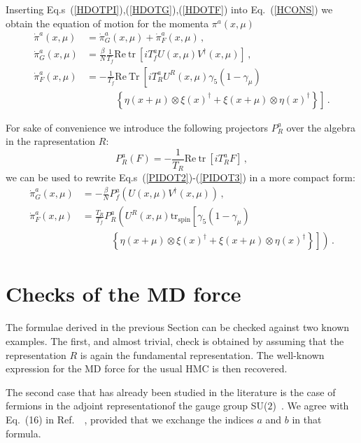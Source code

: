 \documentclass{article}[12pt]
\begin{document}
Inserting Eq.s~(\ref{HDOTPI}),(\ref{HDOTG}),(\ref{HDOTF}) into Eq.~(\ref{HCONS}) we obtain the equation of motion
for the momenta $\pi^a(x,\mu)$
\begin{align}
\dot\pi^a(x,\mu) &= \dot\pi^a_G(x,\mu) + \dot\pi^a_F(x,\mu) \, , \label{PIDOT1}\\
\dot\pi^a_G(x,\mu) &= \frac{\beta}{N} \frac{1}{T_f} \mathrm{Re\ tr\ } \left[ i T^a_f U(x,\mu) V^\dagger(x,\mu) \right] \, ,\label{PIDOT2}\\
\dot\pi^a_F(x,\mu) &=-\frac{1}{T_f} \mathrm{Re\ Tr\ } \left[ iT^a_R U^R(x,\mu) \gamma_5 (1-\gamma_\mu) \right. \nonumber\\
										&\quad\quad\quad	\left. \left\{ \eta(x+\mu)\otimes\xi(x)^\dagger + \xi(x+\mu)\otimes\eta(x)^\dagger \right\} \right]\, . \label{PIDOT3}
\end{align}

For sake of convenience we introduce the following projectors $P^a_R$ over the algebra in the rapresentation $R$:
\begin{equation}
P^a_R ( F ) = - \frac{1}{T_R} \mathrm{Re\ tr\ } \left[ i T^a_R F \right] \, ,
\end{equation}
we can be used to rewrite Eq.s~(\ref{PIDOT2})-(\ref{PIDOT3}) in a more compact form:
\begin{align}
\dot\pi^a_G(x,\mu) &= - \frac{\beta}{N} P^a_f \left( U(x,\mu) V^\dagger(x,\mu) \right) \, ,\\
\dot\pi^a_F(x,\mu) &= \frac{T_R}{T_f} P^a_R \left( U^R(x,\mu) \mathrm{tr_{spin}} \left[ \gamma_5 (1-\gamma_\mu) \right. \right. \nonumber\\
										&\quad\quad\quad	\left. \left. \left\{ \eta(x+\mu)\otimes\xi(x)^\dagger + \xi(x+\mu)\otimes\eta(x)^\dagger \right\} \right] \right)\, . \label{HFFORCE}
\end{align}

\section{Checks of the MD force}
The formulae derived in the previous Section can be checked against two
known examples. The first, and almost trivial, check is obtained by
assuming that the representation $R$ is again the fundamental
representation. The well-known expression for the MD force for the
usual HMC is then recovered.

The second case that has already been studied in the literature is the
case of fermions in the adjoint representationof the gauge group
SU($2$)~\cite{Donini:1996nr}. We agree with Eq.~(16) in
Ref.~~\cite{Donini:1996nr}, provided that we exchange the indices $a$
and $b$ in that formula.
\end{document}
